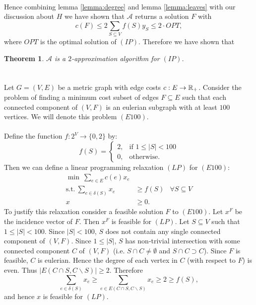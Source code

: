 \documentclass[letterpaper,12pt,oneside,onecolumn]{article}
\newcommand{\cA}{\mathcal{A}} \newcommand{\cB}{\mathcal{B}}
\newtheorem{theorem}[fact]{Theorem}
\begin{document}
\paragraph{}
Hence combining lemma \ref{lemma:degree} and lemma \ref{lemma:leaves} with our discussion about $H$ we have shown that $\cA$ returns a solution $F$ with $$c(F) \leq 2\sum_{S\subseteq V} f(S) y_S \leq 2\cdot OPT,$$
where $OPT$ is the optimal solution of $(IP)$. Therefore we have shown that
\begin{theorem}
$\cA$ is a $2$-approximation algorithm for $(IP)$.
\end{theorem}

\section{}
\paragraph{}
Let $G = (V,E)$ be a metric graph with edge costs $c: E\rightarrow \mathbb{R}_+$. Consider the problem of finding a minimum cost subset of edges $F\subseteq E$ such that each connected component of $(V,F)$ is an eulerian subgraph with at least $100$ vertices. We will denote this problem $(E100)$.
\paragraph{}
Define the function $f:2^V \rightarrow \{0,2\}$ by:
$$f(S) = \begin{cases}
2, &\text{if } 1\leq |S| < 100 \\
0, &\text{otherwise.}
\end{cases}$$
Then we can define a linear programming relaxation $(LP)$ for $(E100)$:
\begin{align*}
\min\ \sum_{e\in E} c(e) x_e&\\
\text{s.t.}\  \sum_{e\in\delta(S)} x_e &\geq f(S) &\forall S \subseteq V \\
x&\geq 0.
\end{align*}
To justify this relaxation consider a feasible solution $F$ to $(E100)$. Let $x^F$ be the incidence vector of $F$. Then $x^F$ is feasible for $(LP)$. Let $S \subseteq V$ such that $1 \leq |S| < 100$. Since $|S| < 100$, $S$ does not contain any single connected component of $(V,F)$. Since $1\leq |S|$, $S$ has non-trivial intersection with some connected component $C$ of $(V,F)$ (i.e. $S\cap C \neq \emptyset$ and $S\cap C \supset C$). Since $F$ is feasible, $C$ is eulerian. Hence the degree of each vertex in $C$ (with respect to $F$) is even. Thus $|E(C\cap S, C\backslash S)| \geq 2$. Therefore
$$\sum_{e \in \delta(S)} x_e \geq \sum_{e \in E(C\cap S, C\backslash S)} x_e \geq 2 \geq f(S),$$
and hence $x$ is feasible for $(LP)$.
\end{document}
